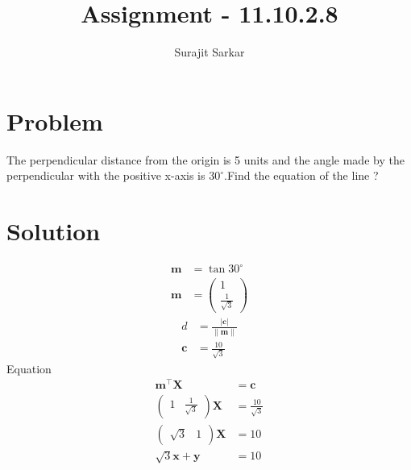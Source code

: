 \documentclass[journal,12pt,twocolumn]{IEEEtran}
\title{\mytitle}
\title{
Assignment - 11.10.2.8
}
\author{Surajit Sarkar}
\newcommand{\myvec}[1]{\ensuremath{\begin{pmatrix}#1\end{pmatrix}}}
\providecommand{\norm}[1]{\lVert#1\rVert}
\let\vec\mathbf
\begin{document}
\maketitle
\tableofcontents
\bigskip
\section{\textbf{Problem}}
The perpendicular distance from the origin is 5 units and the angle made by the perpendicular with the positive x-axis is $30^{\circ}$.Find the equation of the line ?
\section{\textbf{Solution}}
\begin{align}
\vec{m}&=\tan30^{\circ}\\
\vec{m}&=\myvec{1\\\frac{1}{\sqrt{3}}}
\end{align}
\begin{align}
d&=\frac{|\vec{c}|}{\norm{\vec{m}}}\\
\vec{c}&=\frac{10}{\sqrt{3}}
\end{align}
Equation
\begin{align}
    \vec{m}^{\top}\vec{X}&=\vec{c}\\
    \myvec{1&\frac{1}{\sqrt{3}}}\vec{X}&=\frac{10}{\sqrt{3}}\\
    \myvec{\sqrt{3}&1}\vec{X}&=10\\
    \sqrt{3}\vec{x}+\vec{y}&=10
\end{align}
\end{document}
